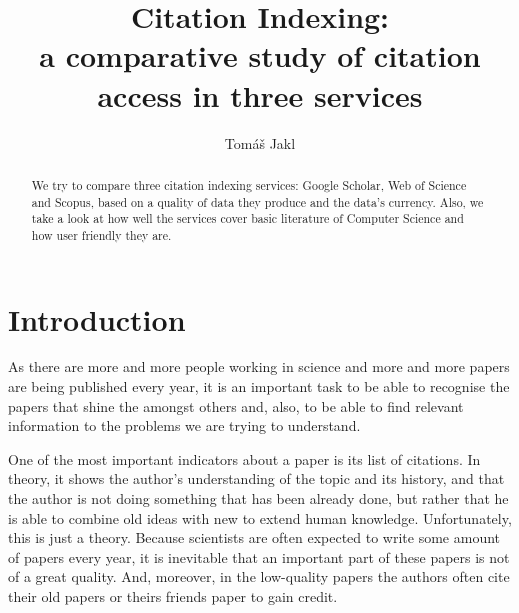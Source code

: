 \documentclass{lmcs}
\begin{document}
\title[Citation Indexing]{Citation Indexing:\\ a comparative study of citation access in three services}


\author{Tom\'a\v s Jakl}
\address{School of Computer Science, The University of Birmingham, Edgbaston Birmingham, B15 2TT, United Kingdom}



\begin{abstract}
  \noindent We try to compare three citation indexing services: Google Scholar, Web of Science and Scopus, based on a quality of data they produce and the data's currency. Also, we take a look at how well the services cover basic literature of Computer Science and how user friendly they are.
\end{abstract}

\maketitle

\section*{Introduction}

As there are more and more people working in science and more and more papers are being published every year, it is an important task to be able to recognise the papers that shine the amongst others and, also, to be able to find relevant information to the problems we are trying to understand.

One of the most important indicators about a paper is its list of citations. In theory, it shows the author's understanding of the topic and its history, and that the author is not doing something that has been already done, but rather that he is able to combine old ideas with new to extend human knowledge. Unfortunately, this is just a theory. Because scientists are often expected to write some amount of papers every year, it is inevitable that an important part of these papers is not of a great quality. And, moreover, in the low-quality papers the authors often cite their old papers or theirs friends paper to gain credit.
\end{document}
